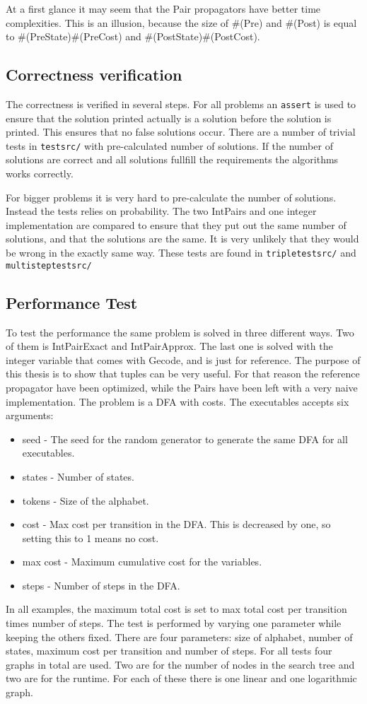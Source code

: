 \documentclass[a4paper,11pt]{article}
\begin{document}
At a first glance it may seem that the Pair propagators have better time complexities. This is an illusion, because the size of \#(Pre) and \#(Post) is equal to \#(PreState)\#(PreCost) and \#(PostState)\#(PostCost).

\subsection{Correctness verification}
The correctness is verified in several steps. For all problems an \texttt{assert} is used to ensure that the solution printed actually is a solution before the solution is printed. This ensures that no false solutions occur. There are a number of trivial tests in \texttt{testsrc/} with pre-calculated number of solutions. If the number of solutions are correct and all solutions fullfill the requirements the algorithms works correctly.

For bigger problems it is very hard to pre-calculate the number of solutions. Instead the tests relies on probability. The two IntPairs and one integer implementation are compared to ensure that they put out the same number of solutions, and that the solutions are the same. It is very unlikely that they would be wrong in the exactly same way. These tests are found in \texttt{tripletestsrc/} and \texttt{multisteptestsrc/}

\subsection{Performance Test}
To test the performance the same problem is solved in three different ways. Two of them is IntPairExact and IntPairApprox. The last one is solved with the integer variable that comes with Gecode, and is just for reference. The purpose of this thesis is to show that tuples can be very useful. For that reason the reference propagator have been optimized, while the Pairs have been left with a very naive implementation. The problem is a DFA with costs. The executables accepts six arguments: 
\begin{itemize}
\item{seed} - The seed for the random generator to generate the same DFA for all executables.
\item{states} - Number of states.
\item{tokens} - Size of the alphabet.
\item{cost} - Max cost per transition in the DFA. This is decreased by one, so setting this to 1 means no cost.
\item{max cost} - Maximum cumulative cost for the variables.
\item{steps} - Number of steps in the DFA.
\end{itemize}
In all examples, the maximum total cost is set to max total cost per transition times number of steps. The test is performed by varying one parameter while keeping the others fixed. There are four parameters: size of alphabet, number of states, maximum cost per transition and number of steps. For all tests four graphs in total are used. Two are for the number of nodes in the search tree and two are for the runtime. For each of these there is one linear and one logarithmic graph.
\end{document}
